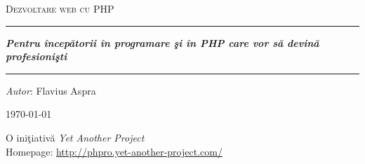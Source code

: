 \begin{titlepage}
\thispagestyle{empty}

\vspace*{10em}

\begin{center}
\textsc{\huge Dezvoltare web cu PHP}\\[5em]

\hrule

\vspace{3em}
\textit{\textbf{Pentru începătorii în programare şi în PHP care vor să devină profesionişti}}
\vspace{3em}
\hrule
\vspace{8em}
\textit{Autor}: Flavius Aspra
\vspace{3em}

\today
\end{center}

\vfill

\begin{flushright}
\begin{Large}
O iniţiativă \emph{Yet Another Project}\\
Homepage: \url{http://phpro.yet-another-project.com/}
\end{Large}
\end{flushright}

\pagebreak
\end{titlepage}